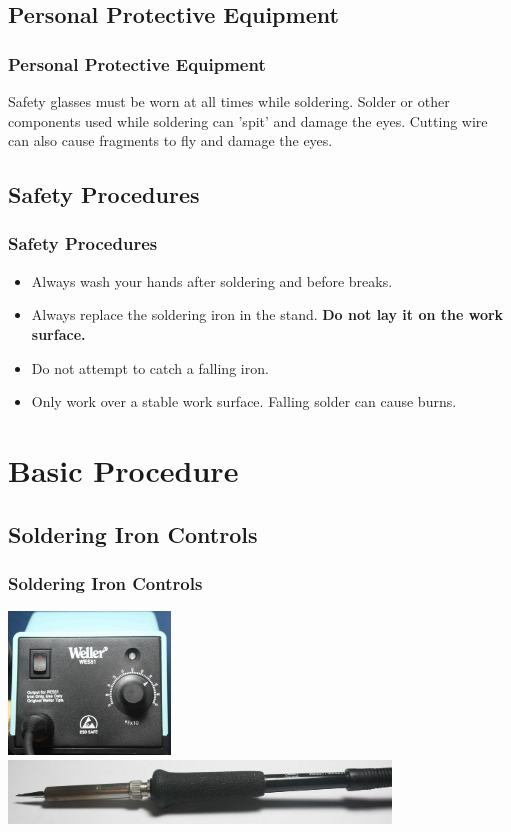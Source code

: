 \documentclass{beamer}
\begin{document}
\subsection{Personal Protective Equipment}
\begin{frame}[t]
	\frametitle{Personal Protective Equipment}
	Safety glasses must be worn at all times while soldering. Solder or other components 
	used while soldering can 'spit' and damage the eyes. Cutting wire can also cause 
	fragments to fly and damage the eyes.
\end{frame}

\subsection{Safety Procedures}
\begin{frame}[t]
	\frametitle{Safety Procedures}
	\begin{itemize}
	\item Always wash your hands after soldering and before breaks.
	\item Always replace the soldering iron in the stand. \textbf{Do not lay it on the work surface.}
	\item Do not attempt to catch a falling iron.
	\item Only work over a stable work surface. Falling solder can cause burns.
	\end{itemize}
\end{frame}

\section{Basic Procedure}
\subsection{Soldering Iron Controls}
\begin{frame}[t]
	\frametitle{Soldering Iron Controls}
	\center
	\includegraphics[height=1.5in]{WellerFront} \\
	\includegraphics[width=4in]{Pencil}
\end{frame}
\end{document}
